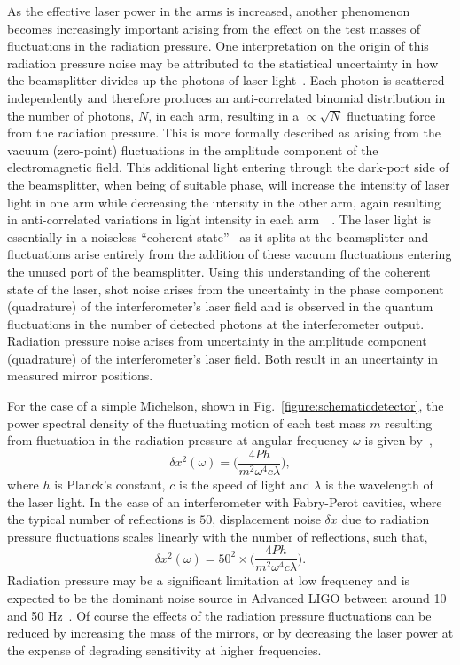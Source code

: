 \documentclass{article}
\begin{document}
As the effective laser power in the arms is increased, another phenomenon
becomes increasingly important arising from the effect on the test masses of
fluctuations in the radiation pressure. One interpretation on the origin of this
radiation pressure noise may be attributed to the statistical uncertainty in how
the beamsplitter divides up the photons of laser light~\cite{Edelstein}. Each
photon is scattered independently and therefore produces an anti-correlated
binomial distribution in the number of photons, $N$, in each arm, resulting in a
$\propto\sqrt{N}$ fluctuating force from the radiation pressure. This is more
formally described as arising from the vacuum (zero-point) fluctuations in the
amplitude component of the electromagnetic field. This additional light entering
through the dark-port side of the beamsplitter, when being of suitable phase,
will increase the intensity of laser light in one arm while decreasing the
intensity in the other arm, again resulting in anti-correlated variations in
light intensity in each arm~\cite{Caves1}~\cite{Caves2}. The laser light is
essentially in a noiseless ``coherent state''~\cite{Glauber:1963} as it splits
at the beamsplitter and fluctuations arise entirely from the addition
of these vacuum fluctuations entering the unused port of the beamsplitter. Using
this understanding of the coherent state of the laser, shot noise arises from
the uncertainty in the phase component (quadrature) of the interferometer's
laser field and is observed in the quantum fluctuations in the number of
detected photons at the interferometer output. Radiation pressure noise arises
from uncertainty in the amplitude component (quadrature) of the interferometer's
laser field. Both result in an uncertainty in measured mirror positions.

For the case of a simple Michelson, shown in
Fig.~\ref{figure:schematicdetector}, the power spectral density of the
fluctuating motion of each test mass $m$ resulting from fluctuation in the
radiation pressure at angular frequency $\omega$ is given by~\cite{Edelstein},
\begin{equation}
\delta x^2(\omega) = \biggl(\frac{4 P h}{m^2 \omega^4 c
\lambda}\biggr),
 \label{equ:radiation-pressure}
\end{equation}
where $h$ is Planck's constant, $c$ is the speed of light and $\lambda$ is the
wavelength of the laser light. In the case of an interferometer with Fabry-Perot
cavities, where the typical number of reflections is $50$, displacement noise
$\delta x$ due to radiation pressure fluctuations scales linearly with the
number of reflections, such that,
\begin{equation}
\delta x^2(\omega) = 50^2 \times \biggl(\frac{4 P h}{m^2 \omega^4
c \lambda}\biggr).
 \label{equ:radiation-pressure}
\end{equation}
Radiation pressure may be a significant limitation at low frequency and is
expected to be the dominant noise source in Advanced LIGO between around 10 and
50 Hz~\cite{Harry:2010}. Of course the effects of the radiation pressure
fluctuations can be reduced by increasing the mass of the mirrors, or by
decreasing the laser power at the expense of degrading sensitivity at higher
frequencies.
\end{document}
